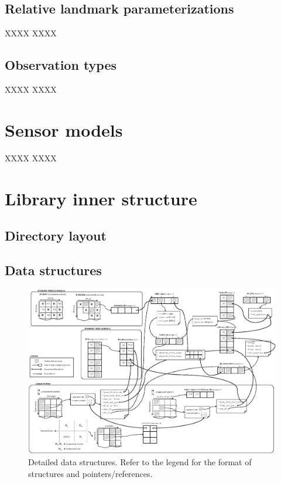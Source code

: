 \documentclass[a4paper,11pt]{article}
\begin{document}
\subsection{Relative landmark parameterizations}

XXXX XXXX 

\subsection{Observation types}

XXXX XXXX 


\section{Sensor models}

XXXX XXXX 


\section{Library inner structure}

\subsection{Directory layout}


\subsection{Data structures}


\begin{figure}
\centering
\includegraphics[width=1.0\textwidth]{imgs/srba_data_structures.eps} 
\caption{Detailed data structures. Refer to the legend for the format of structures and pointers/references.}
\label{fig:detailed.data.structures}
\end{figure}





\newpage


\end{document}

